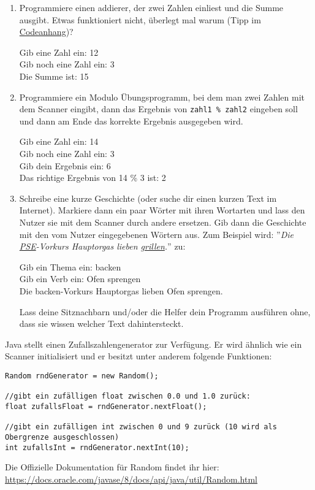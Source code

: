 \documentclass{../../sheet}
\begin{document}
\begin{enumerate}
    \item Programmiere einen addierer, der zwei Zahlen einliest und die Summe ausgibt. Etwas funktioniert nicht, überlegt mal warum (Tipp im \hyperlink{Aufgabe_2.1}{Codeanhang})?
\begin{ausgabe}
Gib eine Zahl ein: 12\\
Gib noch eine Zahl ein: 3\\
Die Summe ist: 15
\end{ausgabe}
    \item Programmiere ein Modulo Übungsprogramm, bei dem man zwei Zahlen mit dem Scanner eingibt, dann das Ergebnis von \texttt{zahl1 \% zahl2} eingeben soll und dann am Ende das korrekte Ergebnis ausgegeben wird.
\begin{ausgabe}
Gib eine Zahl ein: 14\\
Gib noch eine Zahl ein: 3\\
Gib dein Ergebnis ein: 6\\
Das richtige Ergebnis von 14 \% 3 ist: 2
\end{ausgabe}
    \item Schreibe eine kurze Geschichte (oder suche dir einen kurzen Text im Internet). Markiere dann ein paar Wörter mit ihren Wortarten und lass den Nutzer sie mit dem Scanner durch andere ersetzen. Gib dann die Geschichte mit den vom Nutzer eingegebenen Wörtern aus. Zum Beispiel wird: ''\textit{Die \underline{PSE}-Vorkurs Hauptorgas lieben \underline{grillen}.}'' \space zu:
          \begin{ausgabe}
              Gib ein Thema ein: backen\\
              Gib ein Verb ein: Ofen sprengen\\
              Die backen-Vorkurs Hauptorgas lieben Ofen sprengen.
          \end{ausgabe}
          Lass deine Sitznachbarn und/oder die Helfer dein Programm ausführen ohne, dass sie wissen welcher Text dahintersteckt.
\end{enumerate}

\newpage
{}
Java stellt einen Zufallszahlengenerator zur Verfügung. Er wird ähnlich wie ein Scanner initialisiert und er besitzt unter anderem folgende Funktionen:

\begin{verbatim}
Random rndGenerator = new Random();

//gibt ein zufälligen float zwischen 0.0 und 1.0 zurück:
float zufallsFloat = rndGenerator.nextFloat();

//gibt ein zufälligen int zwischen 0 und 9 zurück (10 wird als Obergrenze ausgeschlossen)
int zufallsInt = rndGenerator.nextInt(10);
\end{verbatim}
Die Offizielle Dokumentation für Random findet ihr hier: \url{https://docs.oracle.com/javase/8/docs/api/java/util/Random.html}
\end{document}
